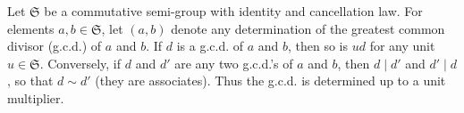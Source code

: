 Let $\mathfrak{S}$ be a commutative semi-group with identity and cancellation law. For elements $a, b \in \mathfrak{S}$, let $(a, b)$ denote any determination of the greatest common divisor (g.c.d.) of $a$ and $b$. If $d$ is a g.c.d. of $a$ and $b$, then so is $ud$ for any unit $u \in \mathfrak{S}$. Conversely, if $d$ and $d'$ are any two g.c.d.'s of $a$ and $b$, then $d \mid d'$ and $d' \mid d$, so that $d \sim d'$ (they are associates). Thus the g.c.d. is determined up to a unit multiplier.

